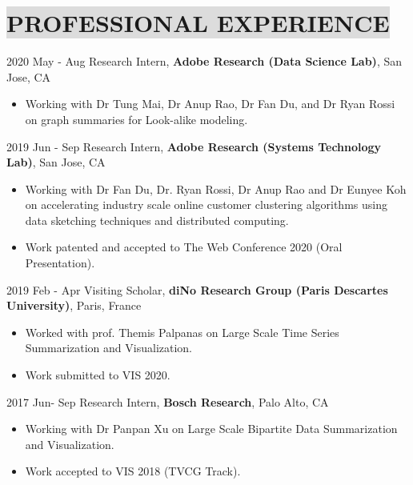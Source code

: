 \section*{
    \colorbox{gainsboro}{PROFESSIONAL EXPERIENCE}
}

2020 May - Aug \hspace{9mm} 
Research Intern, \textbf{Adobe Research (Data Science Lab)},  San Jose, CA
\vspace{-1mm}
\begin{itemize}[noitemsep,itemsep=0pt,topsep=0pt,leftmargin=38mm]
    \item Working with Dr Tung Mai, Dr Anup Rao, Dr Fan Du, and Dr Ryan Rossi on graph summaries for Look-alike modeling. 
\end{itemize}

2019 Jun - Sep \hspace{10mm} 
Research Intern, \textbf{Adobe Research (Systems Technology Lab)},  San Jose, CA
\vspace{-1mm}
\begin{itemize}[noitemsep,itemsep=0pt,topsep=0pt,leftmargin=38mm]
    \item Working with Dr Fan Du, Dr. Ryan Rossi, Dr Anup Rao and Dr Eunyee Koh on accelerating industry scale online customer clustering algorithms using data sketching techniques and distributed computing.
    \item Work patented and accepted to The Web Conference 2020 (Oral Presentation).
\end{itemize}

2019 Feb - Apr \hspace{10mm} 
Visiting Scholar, \textbf{diNo Research Group (Paris Descartes University)}, Paris, France
\vspace{-1mm}
\begin{itemize}[noitemsep,itemsep=0pt,topsep=0pt,leftmargin=38mm]
    \item Worked with prof. Themis Palpanas on Large Scale Time Series Summarization and Visualization.
    \item Work submitted to VIS 2020.
\end{itemize}

2017 Jun- Sep \hspace{10mm} 
Research Intern, \textbf{Bosch Research}, Palo Alto, CA
\vspace{-1mm}
\begin{itemize}[noitemsep,itemsep=0pt,topsep=0pt,leftmargin=38mm]
    \item Working with Dr Panpan Xu on Large Scale Bipartite Data Summarization and Visualization.
    \item Work accepted to VIS 2018 (TVCG Track).
\end{itemize}

